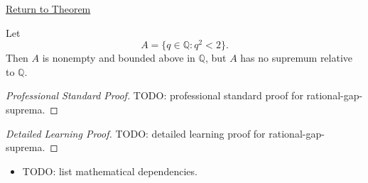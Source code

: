 \newpage
{}
\label{prf:rational-gap-suprema}

\begin{remark*}[Return]
\hyperref[lem:rational-gap-suprema]{Return to Theorem}
\end{remark*}

\begin{lemma*}
Let
\[
  A=\{q\in\mathbb{Q}:q^2<2\}.
\]
Then $A$ is nonempty and bounded above in $\mathbb{Q}$, but $A$ has no supremum relative to $\mathbb{Q}$.
\end{lemma*}

\begin{proof}[Professional Standard Proof]
\LRAProofBodyStart
TODO: professional standard proof for rational-gap-suprema.
\end{proof}

\begin{proof}[Detailed Learning Proof]
\LRAProofBodyStart
TODO: detailed learning proof for rational-gap-suprema.
\end{proof}

\begin{remark*}
\end{remark*}

\begin{dependencies}
\begin{itemize}
  \item TODO: list mathematical dependencies.
\end{itemize}
\end{dependencies}

\clearpage
